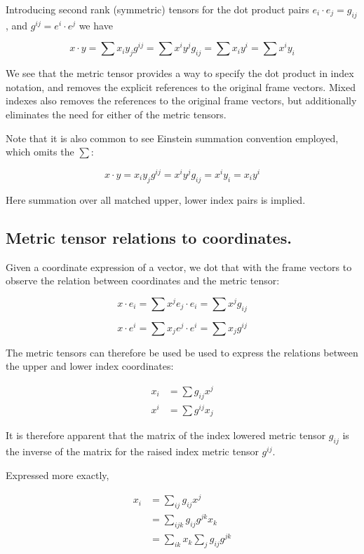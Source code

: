 Introducing second rank (symmetric) tensors for the dot product pairs $ e_i \cdot e_j = g_{ij}$, and $ g^{ij} = e^i \cdot e^j $ we have

\[
x \cdot y = \sum x_i y_j g^{ij} = \sum x^i y^j g_{ij} = \sum x_i y^i = \sum x^i y_i
\]

We see that the metric tensor provides a way to specify the dot product in index notation, and removes the explicit references to the original frame vectors.  Mixed indexes also removes the references to the original frame vectors, but additionally eliminates the need for either of the metric tensors.

Note that it is also common to see Einstein summation convention employed, which omits the $\sum$:

\[
x \cdot y = x_i y_j g^{ij} = x^i y^j g_{ij} = x^i y_i = x_i y^i
\]

Here summation over all matched upper, lower index pairs is implied.

\subsection{Metric tensor relations to coordinates. }

Given a coordinate expression of a vector, we dot that with the frame vectors to observe the relation between coordinates and the metric tensor:

\[
x \cdot e_i = \sum x^j e_j \cdot e_i = \sum x^j g_{ij}
\]

\[
x \cdot e^i = \sum x_j e^j \cdot e^i = \sum x_j g^{ij}
\]

The metric tensors can therefore be used be used to express the relations between the upper and lower index coordinates:

\begin{align}
x_i &= \sum g_{ij} x^j \label{eqn:tensor:metric_upper_to_lower} \\
x^i &= \sum g^{ij} x_j \label{eqn:tensor:metric_lower_to_upper}
\end{align}

It is therefore apparent that the matrix of the index lowered metric tensor $g_{ij}$ is the inverse of the matrix for the raised index metric tensor $g^{ij}$.

Expressed more exactly, 

\begin{align*}
x_i
&= \sum_{ij} g_{ij} x^j \\
&= \sum_{ijk} g_{ij} g^{jk} x_k \\
&= \sum_{ik} x_k \sum_j g_{ij} g^{jk} \\
\end{align*}

